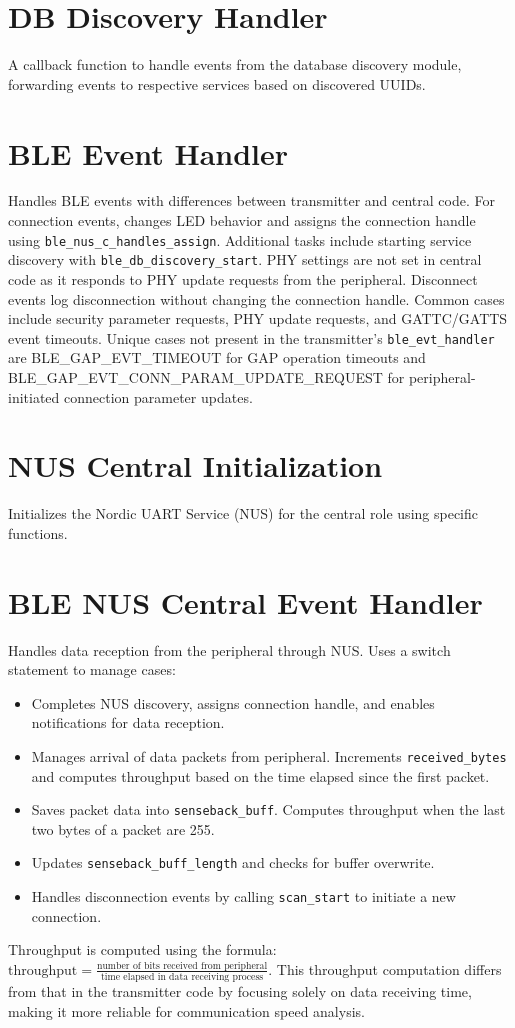\documentclass{Configuration_Files/PoliMi3i_thesis}
\begin{document}
\section*{DB Discovery Handler}
A callback function to handle events from the database discovery module, forwarding events to respective services based on discovered UUIDs.

\section*{BLE Event Handler}
Handles BLE events with differences between transmitter and central code. For connection events, changes LED behavior and assigns the connection handle using \texttt{ble\_nus\_c\_handles\_assign}. Additional tasks include starting service discovery with \texttt{ble\_db\_discovery\_start}. PHY settings are not set in central code as it responds to PHY update requests from the peripheral. Disconnect events log disconnection without changing the connection handle. Common cases include security parameter requests, PHY update requests, and GATTC/GATTS event timeouts. Unique cases not present in the transmitter's \texttt{ble\_evt\_handler} are BLE\_GAP\_EVT\_TIMEOUT for GAP operation timeouts and BLE\_GAP\_EVT\_CONN\_PARAM\_UPDATE\_REQUEST for peripheral-initiated connection parameter updates.

\section*{NUS Central Initialization}
Initializes the Nordic UART Service (NUS) for the central role using specific functions.

\section*{BLE NUS Central Event Handler}
Handles data reception from the peripheral through NUS. Uses a switch statement to manage cases:
\begin{itemize}
    \item Completes NUS discovery, assigns connection handle, and enables notifications for data reception.
    \item Manages arrival of data packets from peripheral. Increments \texttt{received\_bytes} and computes throughput based on the time elapsed since the first packet.
    \item Saves packet data into \texttt{senseback\_buff}. Computes throughput when the last two bytes of a packet are 255.
    \item Updates \texttt{senseback\_buff\_length} and checks for buffer overwrite.
    \item Handles disconnection events by calling \texttt{scan\_start} to initiate a new connection.
\end{itemize}
Throughput is computed using the formula: \(\text{throughput} = \frac{\text{number of bits received from peripheral}}{\text{time elapsed in data receiving process}}\). This throughput computation differs from that in the transmitter code by focusing solely on data receiving time, making it more reliable for communication speed analysis.
\end{document}
